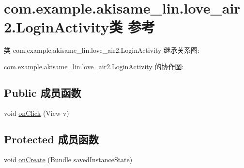 \hypertarget{classcom_1_1example_1_1akisame__lin_1_1love__air2_1_1_login_activity}{}\section{com.\+example.\+akisame\+\_\+lin.\+love\+\_\+air2.\+Login\+Activity类 参考}
\label{classcom_1_1example_1_1akisame__lin_1_1love__air2_1_1_login_activity}


类 com.\+example.\+akisame\+\_\+lin.\+love\+\_\+air2.\+Login\+Activity 继承关系图\+:


com.\+example.\+akisame\+\_\+lin.\+love\+\_\+air2.\+Login\+Activity 的协作图\+:
\subsection*{Public 成员函数}
\begin{DoxyCompactItemize}
\item 
void \mbox{\hyperlink{classcom_1_1example_1_1akisame__lin_1_1love__air2_1_1_login_activity_a3dcd788b6c8f37fb50960c77f3cd6e63}{on\+Click}} (View v)
\end{DoxyCompactItemize}
\subsection*{Protected 成员函数}
\begin{DoxyCompactItemize}
\item 
void \mbox{\hyperlink{classcom_1_1example_1_1akisame__lin_1_1love__air2_1_1_login_activity_a9f9dc15c8ce82328bcafa3ecac8d9d9a}{on\+Create}} (Bundle saved\+Instance\+State)
\end{DoxyCompactItemize}
